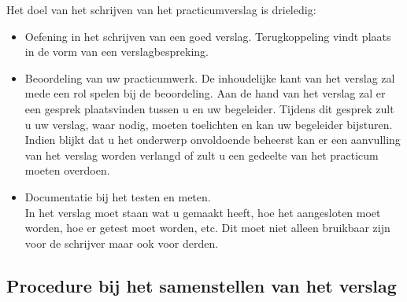 Het doel van het schrijven van het practicumverslag is drieledig: 
\begin{itemize}
\item
Oefening in het schrijven van een goed verslag. Terugkoppeling vindt plaats in 
de vorm van een verslagbespreking.
\item
Beoordeling van uw practicumwerk.
De inhoudelijke kant van het verslag zal mede een rol spelen bij de beoordeling.
Aan de hand van het verslag zal er een gesprek 
plaatsvinden tussen u en uw begeleider. Tijdens dit gesprek zult u uw 
verslag, waar nodig, moeten toelichten en kan uw begeleider bijsturen. Indien 
blijkt dat u het onderwerp onvoldoende beheerst kan er een aanvulling van 
het verslag worden verlangd of zult u een gedeelte van het practicum moeten 
overdoen. 
\item
Documentatie bij het testen en meten.\\
In het verslag moet staan wat u gemaakt heeft,
hoe het aangesloten moet worden,
hoe er getest moet worden, etc.
Dit moet niet alleen bruikbaar zijn voor de
schrijver maar ook voor derden.
\end{itemize}

\subsection{Procedure bij het samenstellen van het verslag }

